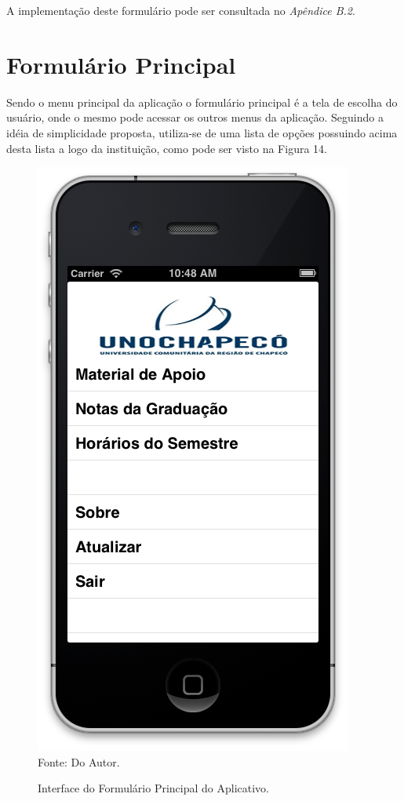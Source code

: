 A implementação deste formulário pode ser consultada no \emph{Apêndice B.2}.

\section{Formulário Principal}

Sendo o menu principal da aplicação o formulário principal é a tela de escolha do usuário, onde o mesmo pode acessar os outros menus da aplicação. Seguindo a idéia de simplicidade proposta, utiliza-se de uma lista de opções possuindo acima desta lista a logo da instituição, como pode ser visto na Figura 14.

\begin{figure}[!htb]
     \centering
     \caption[Formulário Principal - Interface]{Interface do Formulário Principal do Aplicativo.}
     \includegraphics[scale=0.34]{imagens/formprincipal.png}
     \\  Fonte: Do Autor.
\end{figure}

